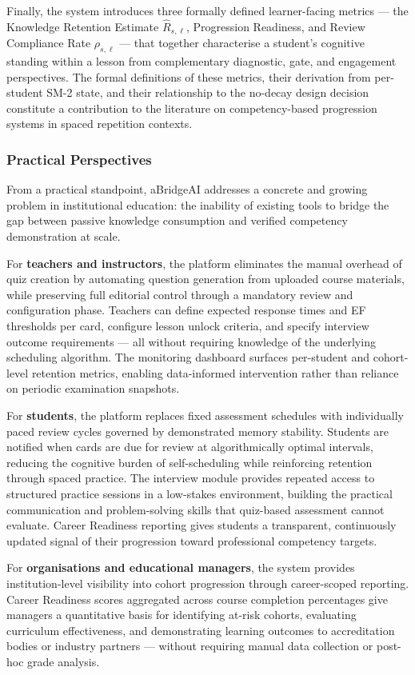 Finally, the system introduces three formally defined learner-facing metrics — the Knowledge Retention Estimate $\hat{R}_{s,\ell}$, Progression Readiness, and Review Compliance Rate $\rho_{s,\ell}$ — that together characterise a student's cognitive standing within a lesson from complementary diagnostic, gate, and engagement perspectives. The formal definitions of these metrics, their derivation from per-student SM-2 state, and their relationship to the no-decay design decision constitute a contribution to the literature on competency-based progression systems in spaced repetition contexts.

\subsubsection{Practical Perspectives}
From a practical standpoint, aBridgeAI addresses a concrete and growing problem in institutional education: the inability of existing tools to bridge the gap between passive knowledge consumption and verified competency demonstration at scale.

For \textbf{teachers and instructors}, the platform eliminates the manual overhead of quiz creation by automating question generation from uploaded course materials, while preserving full editorial control through a mandatory review and configuration phase. Teachers can define expected response times and EF thresholds per card, configure lesson unlock criteria, and specify interview outcome requirements — all without requiring knowledge of the underlying scheduling algorithm. The monitoring dashboard surfaces per-student and cohort-level retention metrics, enabling data-informed intervention rather than reliance on periodic examination snapshots.

For \textbf{students}, the platform replaces fixed assessment schedules with individually paced review cycles governed by demonstrated memory stability. Students are notified when cards are due for review at algorithmically optimal intervals, reducing the cognitive burden of self-scheduling while reinforcing retention through spaced practice. The interview module provides repeated access to structured practice sessions in a low-stakes environment, building the practical communication and problem-solving skills that quiz-based assessment cannot evaluate. Career Readiness reporting gives students a transparent, continuously updated signal of their progression toward professional competency targets.

For \textbf{organisations and educational managers}, the system provides institution-level visibility into cohort progression through career-scoped reporting. Career Readiness scores aggregated across course completion percentages give managers a quantitative basis for identifying at-risk cohorts, evaluating curriculum effectiveness, and demonstrating learning outcomes to accreditation bodies or industry partners — without requiring manual data collection or post-hoc grade analysis.

